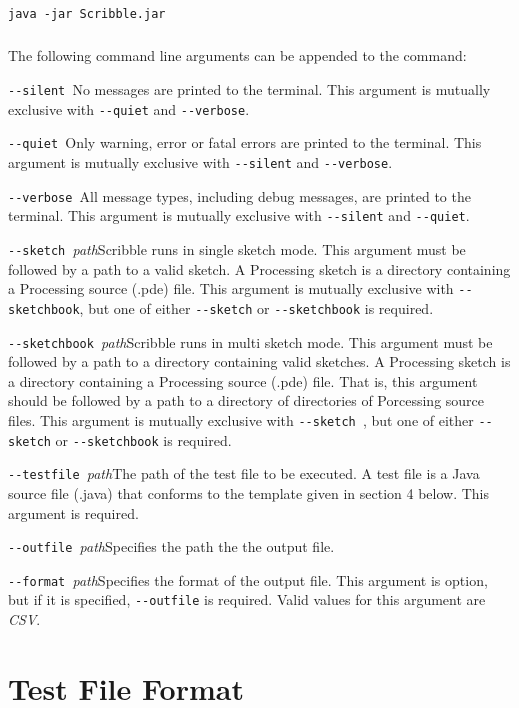 \documentclass[11pt, a4paper, onecolumn, portrait]{article}
\begin{document}
\subparagraph{}
\quad\verb|java -jar Scribble.jar|

\subparagraph{}
The following command line arguments can be appended to the command:

\begin{description}
\item{\verb|--silent |}\quad No messages are printed to the terminal. This argument is mutually exclusive with \verb|--quiet| and \verb|--verbose|.
\item{\verb|--quiet |}\quad Only warning, error or fatal errors are printed to the terminal. This argument is mutually exclusive with \verb|--silent| and \verb|--verbose|.
\item{\verb|--verbose |}\quad All message types, including debug messages, are printed to the terminal. This argument is mutually exclusive with \verb|--silent| and \verb|--quiet|.
\item{\verb|--sketch |\emph{path}}\quad Scribble runs in single sketch mode. This argument must be followed by a path to a valid sketch. A Processing sketch is a directory containing a Processing source (.pde) file. This argument is mutually exclusive with \verb|--sketchbook|, but one of either \verb|--sketch| or \verb|--sketchbook| is required.
\item{\verb|--sketchbook |\emph{path}}\quad Scribble runs in multi sketch mode. This argument must be followed by a path to a directory containing valid sketches. A Processing sketch is a directory containing a Processing source (.pde) file. That is, this argument should be followed by a path to a directory of directories of Porcessing source files. This argument is mutually exclusive with \verb|--sketch |, but one of either \verb|--sketch| or \verb|--sketchbook| is required.
\item{\verb|--testfile |\emph{path}}\quad The path of the test file to be executed. A test file is a Java source file (.java) that conforms to the template given in section 4 below. This argument is required.
\item{\verb|--outfile |\emph{path}}\quad Specifies the path the the output file.
\item{\verb|--format |\emph{path}}\quad Specifies the format of the output file. This argument is option, but if it is specified, \verb|--outfile| is required. Valid values for this argument are \emph{CSV}.
\end{description}


\section{Test File Format}
\end{document}
